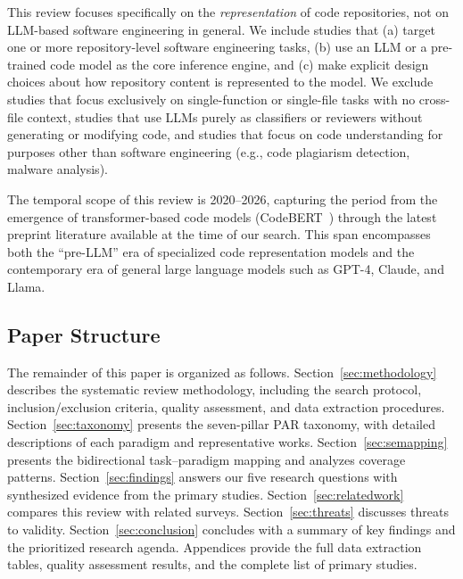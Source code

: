 This review focuses specifically on the \emph{representation} of code repositories, not on
LLM-based software engineering in general. We include studies that (a) target one or more
repository-level software engineering tasks, (b) use an LLM or a pre-trained code model as
the core inference engine, and (c) make explicit design choices about how repository content
is represented to the model. We exclude studies that focus exclusively on single-function or
single-file tasks with no cross-file context, studies that use LLMs purely as classifiers or
reviewers without generating or modifying code, and studies that focus on code understanding
for purposes other than software engineering (e.g., code plagiarism detection, malware analysis).

The temporal scope of this review is 2020--2026, capturing the period from the emergence of
transformer-based code models (CodeBERT~\cite{feng2020codebert}) through the latest
preprint literature available at the time of our search. This span encompasses both the
``pre-LLM'' era of specialized code representation models and the contemporary era of general
large language models such as GPT-4, Claude, and Llama.

\subsection{Paper Structure}

The remainder of this paper is organized as follows. Section~\ref{sec:methodology} describes
the systematic review methodology, including the search protocol, inclusion/exclusion criteria,
quality assessment, and data extraction procedures. Section~\ref{sec:taxonomy} presents the
seven-pillar PAR taxonomy, with detailed descriptions of each paradigm and representative
works. Section~\ref{sec:semapping} presents the bidirectional task--paradigm mapping and
analyzes coverage patterns. Section~\ref{sec:findings} answers our five research questions
with synthesized evidence from the primary studies. Section~\ref{sec:relatedwork} compares
this review with related surveys. Section~\ref{sec:threats} discusses threats to validity.
Section~\ref{sec:conclusion} concludes with a summary of key findings and the prioritized
research agenda. Appendices provide the full data extraction tables, quality assessment
results, and the complete list of primary studies.

